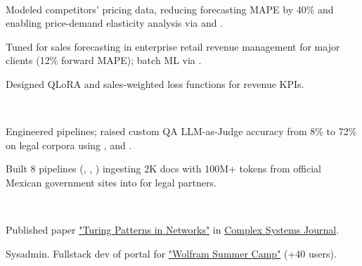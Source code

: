 \documentclass{tex/deedy-resume-openfont}
\begin{document}
\begin{minipage}[t]{0.67\textwidth}
\\
\begin{tightemize}
    \item Modeled competitors' pricing data, reducing forecasting MAPE by 40\% and enabling price-demand elasticity analysis via  and .
    \item Tuned   for sales forecasting in enterprise retail revenue management for major clients (12\% forward MAPE);  batch ML via .
    \item Designed QLoRA and sales-weighted loss functions for revenue KPIs.
\end{tightemize}
\sectionsep

\\
\begin{tightemize}
    \item Engineered  pipelines; raised custom QA LLM-as-Judge accuracy from 8\% to 72\% on legal corpora using ,  and .
    \item Built 8  pipelines (, , ) ingesting 2K docs with 100M+ tokens from official Mexican government sites into  for legal partners.
\end{tightemize}
\sectionsep

\\
\begin{tightemize}
    \item Published paper \href{https://www.complex-systems.com/abstracts/v32_i03_a02/}{"Turing Patterns in Networks"} in \href{https://www.complex-systems.com/}{Complex Systems Journal}.
    \item Sysadmin. Fullstack dev of portal for \href{https://www.notebookarchive.org/collection-pod?collection=wolfram-summer-school-2021}{"Wolfram Summer Camp"} (+40 users).
\end{tightemize}


\end{minipage}
\end{document}
